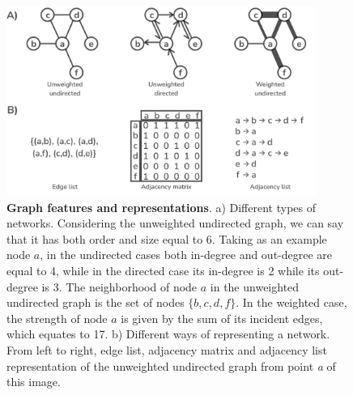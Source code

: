 \begin{figure}[hb]
  \centering
  \includegraphics[width=0.9\textwidth]{networks.png}
  \caption{\textbf{Graph features and representations}. a) Different types of networks. Considering the unweighted undirected graph, we can say that it has both order and size equal to 6. Taking as an example node $a$, in the undirected cases both in-degree and out-degree are equal to 4, while in the directed case its in-degree is 2 while its out-degree is 3. The neighborhood of node $a$ in the unweighted undirected graph is the set of nodes $\{b,c,d,f\}$. In the weighted case, the strength of node $a$ is given by the sum of its incident edges, which equates to 17. b) Different ways of representing a network. From left to right, edge list, adjacency matrix and adjacency list representation of the unweighted undirected graph from point \emph{a} of this image.}
  \label{fig:networks}
\end{figure}

